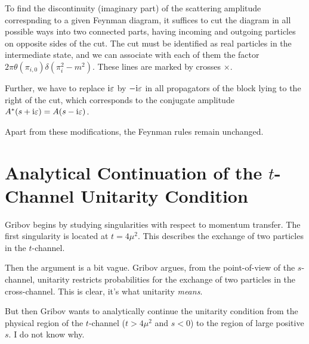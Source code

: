 To find the discontinuity (imaginary part) of the scattering amplitude
correspnding to a given Feynman diagram, it suffices to cut the diagram
in all possible ways into two connected parts, having incoming and
outgoing particles on opposite sides of the cut. The cut must be
identified as real particles in the intermediate state, and we can
associate with each of them the factor $2\pi\theta(\pi_{i,0})\delta(\pi_{i}^{2}-m^{2})$.
These lines are marked by crosses $\times$.

Further, we have to replace $\mathrm{i}\varepsilon$ by $-\mathrm{i}\varepsilon$ in all
propagators of the block lying to the right of the cut, which
corresponds to the conjugate amplitude $A^{*}(s+\mathrm{i}\varepsilon)=A(s-\mathrm{i}\varepsilon)$.

Apart from these modifications, the Feynman rules remain unchanged.

\vfill

\section{Analytical Continuation of the \texorpdfstring{$t$}{t}-Channel Unitarity Condition}

\M Gribov begins by studying singularities with respect to momentum
transfer. The first singularity is located at $t=4\mu^{2}$. This
describes the exchange of two particles in the $t$-channel.

Then the argument is a bit vague. Gribov argues, from the point-of-view
of the $s$-channel, unitarity restricts probabilities for the exchange
of two particles in the cross-channel. This is clear, it's what
unitarity \emph{means}.

But then Gribov wants to analytically continue the unitarity condition
from the physical region of the $t$-channel ($t>4\mu^{2}$ and $s<0$) to
the region of large positive $s$. I do not know why.

